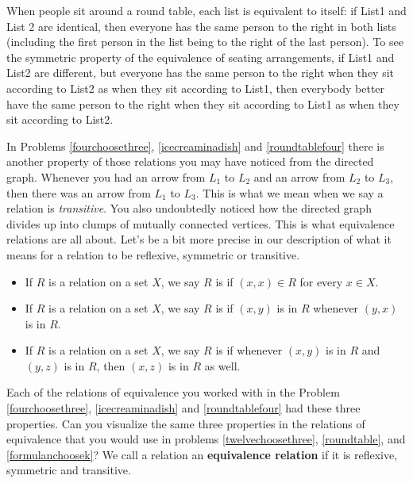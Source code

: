 When people sit
around a round table, each list is equivalent to itself:
if List1 and List 2 are identical, then everyone has the same
person to the right in both lists (including the first person in
the list being to the right of the last person).  To see the
symmetric property of the equivalence of seating arrangements, if
List1 and List2 are different, but everyone has the same person to
the right when they sit according to List2 as when they sit
according to List1, then everybody better have the same person to
the right when they sit according to List1 as when they sit
according to List2.  



 In Problems
\ref{fourchoosethree}, \ref{icecreaminadish} and
\ref{roundtablefour} there is another property of those relations
you may have noticed from the directed graph.  Whenever you had
an arrow from
$L_1$ to
$L_2$ and an arrow from
$L_2$ to $L_3$, then there was an arrow from $L_1$ to $L_3$. 
This is what we mean when we say a relation is {\em
transitive}.  You also undoubtedly noticed how the directed
graph divides up into clumps of mutually connected vertices. 
This is what equivalence relations are all about.  Let's be a
bit more precise in our description of what it means for a
relation to be reflexive, symmetric or transitive.  

\begin{itemize} 
\item If $R$ is a relation on a set $X$, we say $R$ is
  if $(x,x)\in
R$ for every
$x\in X$.  
\item If $R$ is a relation on a set $X$, we say $R$ is
 if $(x,y)$ is
in
$R$ whenever
$(y,x)$ is in $R$.
\item If $R$ is a relation on a set $X$, we say $R$ is
 if
whenever
$(x,y)$ is in
$R$ and
$(y,z)$ is in
$R$, then $(x,z)$ is in
$R$ as well.
\end{itemize}

Each of the relations of equivalence you worked with in the
Problem \ref{fourchoosethree}, \ref{icecreaminadish} and
\ref{roundtablefour}  had these three properties.  Can you
visualize the same three properties in the relations of
equivalence that you would use in problems
\ref{twelvechoosethree}, \ref{roundtable}, and
\ref{formulanchoosek}? We call a relation an {\bf equivalence
relation} if it is reflexive,
symmetric and transitive. 

